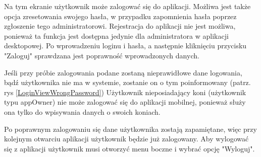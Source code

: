 \documentclass[12pt,oneside]{report}
\begin{document}
Na tym ekranie użytkownik może zalogować się do aplikacji. Możliwa jest także opcja zresetowania swojego hasła, w przypadku zapomnienia hasła poprzez zgłoszenie tego administratorowi. Rejestracja do aplikacji nie jest możliwa, ponieważ ta funkcja jest dostępna jedynie dla administratora w aplikacji desktopowej. Po wprowadzeniu loginu i hasła, a następnie kliknięciu przycisku "Zaloguj" sprawdzana jest poprawność wprowadzonych danych. 

Jeśli przy próbie zalogowania podane zostaną nieprawidłowe dane logowania, bądź użytkownika nie ma w systemie, zostanie on o tym poinformowany (patrz. rys \ref{LoginViewWrongPassword})
Użytkownik nieposiadający koni (użytkownik typu appOwner) nie może zalogować się do aplikacji mobilnej, ponieważ służy ona tylko do wpisywania danych o swoich koniach.

Po poprawnym zalogowaniu się dane użytkownika zostają zapamiętane, więc przy kolejnym otwarciu aplikacji użytkownik będzie już zalogowany.
Aby wylogować się z aplikacji użytkownik musi otworzyć menu boczne i wybrać opcję "Wyloguj".
\end{document}
